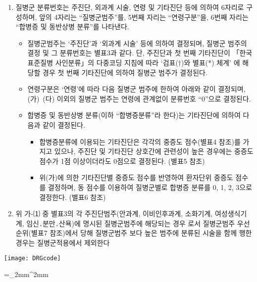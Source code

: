 \begin{enumerate}[가.]\tightlist
\item 질병군 분류번호는 주진단, 외과계 시술, 연령 및 기타진단 등에 의하여 6자리로 구성하며, 앞의 4자리는 “질병군범주”를, 5번째 자리는 “연령구분”을, 6번째 자리는 “합병증 및 동반상병 분류”를 나타낸다.
	\begin{itemize}\tightlist
	\item 질병군범주는 ‘주진단’과 ‘외과계 시술’ 등에 의하여 결정되며, 질병군 범주의 결정 및 그 분류번호는 별표3과 같다. 단, 주진단과 첫 번째 기타진단이 「한국표준질병 사인분류」의 다중코딩 지침에 따라 ‘검표(†)와 별표(*) 체계’ 에 해당할 경우 첫 번째 기타진단에 의하여 질병군 범주가 결정된다.
	\item 연령구분은 ‘연령’에 따라 다음 질병군 범주에 한하여 아래와 같이 결정되며, (가)~(다) 이외의 질병군 범주는 연령에 관계없이 분류번호 “0”으로 결정된다.
	\item 합병증 및 동반상병 분류(이하 “합병증분류”라 한다)는 기타진단에 의하여 다음과 같이 결정된다.
		\begin{itemize}\tightlist
		\item 합병증분류에 이용되는 기타진단은 각각의 중증도 점수(별표4 참조)를 가지고 있으나, 주진단 및 기타진단 상호간에 관련성이 높은 경우에는 중증도 점수가 1점 이상이더라도 0점으로 결정된다. (별표5 참조)
		\item 위(가)에 의한 기타진단별 중증도 점수를 반영하여 환자단위 중증도 점수를 결정하며, 동 점수를 이용하여 질병군별로 합병증 분류를 0, 1, 2, 3으로 결정한다. (별표6 참조)
		\end{itemize}
	\end{itemize}	
\item 위 가-⑴ 중 별표3의 각 주진단범주(안과계, 이비인후과계, 소화기계, 여성생식기계, 임신․분만․산욕)에 명시된 질병군범주에 해당되는 경우 로서 질병군범주 우선순위(별표7 참조)에서 당해 질병군범주 보다 높은 범주에 분류된 시술을 함께 행한 경우는 질병군적용에서 제외한다
\end{enumerate}
\prezi{\clearpage}
\begin{center}
\texttt{[image: DRGcode]}
\end{center}
\prezi{\clearpage}
\par
\medskip
\tabulinesep =_2mm^2mm
